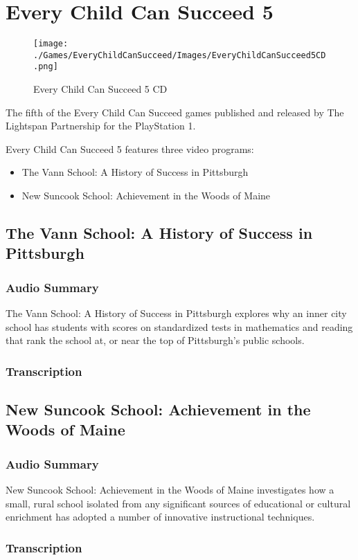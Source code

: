\chapter{Every Child Can Succeed 5}

\begin{figure}[H]
    \centering
    \texttt{[image: ./Games/EveryChildCanSucceed/Images/EveryChildCanSucceed5CD.png]}
    \caption{Every Child Can Succeed 5 CD}
\end{figure}

The fifth of the Every Child Can Succeed games published and released by The Lightspan Partnership for the PlayStation 1.

Every Child Can Succeed 5 features three video programs:

\begin{itemize}
    \item The Vann School: A History of Success in Pittsburgh
    \item New Suncook School: Achievement in the Woods of Maine
\end{itemize}

\clearpage
\newpage

\section{The Vann School: A History of Success in Pittsburgh}

\subsection{Audio Summary}

The Vann School: A History of Success in Pittsburgh explores why an inner city school has students with scores on standardized tests in mathematics and reading that rank the school at, or near the top of Pittsburgh's public schools.

\subsection{Transcription}

\section{New Suncook School: Achievement in the Woods of Maine}

\subsection{Audio Summary}

New Suncook School: Achievement in the Woods of Maine investigates how a small, rural school isolated from any significant sources of educational or cultural enrichment has adopted a number of innovative instructional techniques.

\subsection{Transcription}
